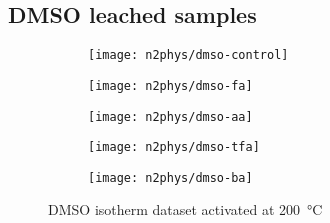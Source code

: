 \subsection{\gls{DMSO} leached samples}
\begin{figure}[H]
    \centering
    \begin{subfigure}{0.46\linewidth}
        \texttt{[image: n2phys/dmso-control]}%
        \label{appx:def:fig:n2phys-dmso-cont}
    \end{subfigure}%
    \begin{subfigure}{0.46\linewidth}
        \texttt{[image: n2phys/dmso-fa]}%
        \label{appx:def:fig:n2phys-dmso-fa}
    \end{subfigure}%

    
    \begin{subfigure}{0.46\linewidth}
        \texttt{[image: n2phys/dmso-aa]}%
        \label{appx:def:fig:n2phys-dmso-aa}
    \end{subfigure}%
    \begin{subfigure}{0.46\linewidth}
        \texttt{[image: n2phys/dmso-tfa]}%
        \label{appx:def:fig:n2phys-dmso-tfa}
    \end{subfigure}%

    \begin{subfigure}{0.46\linewidth}
        \texttt{[image: n2phys/dmso-ba]}%
        \label{appx:def:fig:n2phys-dmso-ba}
    \end{subfigure}%

    \caption{\gls{DMSO} isotherm dataset activated at \SI{200}{\degreeCelsius}}%
    
\end{figure}

